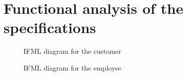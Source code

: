 
\chapter{Functional analysis of the specifications}

\begin{landscape}
    \thispagestyle{landscape}
    \begin{figure}[!htbp]
        \vspace*{-\oddsidemargin * 2}
        \centerline{}
        \caption{IFML diagram for the customer}
        \label{fig:ifml_diagram_customer}
        \vspace{-100pt}
    \end{figure}
\end{landscape}

\begin{landscape}
    \thispagestyle{landscape}
    \begin{figure}[p]
        \vspace*{-\oddsidemargin * 2}
        \centerline{}
        \caption{IFML diagram for the employee}
        \label{fig:ifml_diagram_employee}
    \end{figure}
\end{landscape}